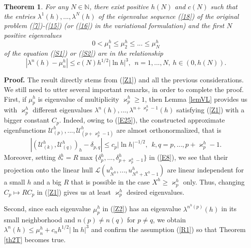 \documentclass[11pt]{article}%
\newtheorem{theorem}{Theorem}
\numberwithin{equation}{section}
\begin{document}
\begin{theorem}
\label{thASYM}For any $N\in\mathbb{N}$, there exist positive $h(N)$ and $c(N)$
such that the entries $\lambda^{1}(h),...,\lambda^{N}(h)$ of the eigenvalue
sequence (\ref{18}) of the original problem (\ref{7})-(\ref{15}) (or
(\ref{16}) in the variational formulation) and the first $N$ positive
eigenvalues%
\begin{equation}
0<\mu_{1}^{h}\leq\mu_{2}^{h}\leq...\leq\mu_{N}^{h} \label{Z2}%
\end{equation}
of the equation (\ref{S1}) or (\ref{S2}) are in the relationship%
\begin{equation}
|\lambda^{n}(h)-\mu_{n}^{h}|\leq c(N)h^{1/2}|\ln h|^{3},\ \ n=1,...,N,\ h\in
(0,h(N)). \label{Z3}%
\end{equation}

\end{theorem}

\textbf{Proof.} The result directly stems from (\ref{Z1}) and all the previous
considerations. We still need to utter several important remarks, in order to
complete the proof. First, if $\mu_{p}^{h}$ is eigenvalue of multiplicity
$\varkappa_{p}^{h}\geq1$, then Lemma \ref{lemVL} provides us with
$\varkappa_{p}^{h}$ different eigenvalues $\lambda^{n}(h),...,\lambda
^{n+\varkappa_{p}^{h}-1}(h)$ satisfying (\ref{Z1}) with a bigger constant
$C_{p}$. Indeed, owing to (\ref{E25}), the constructed approximate
eigenfunctions $\mathcal{U}_{(p)}^{h},...,\mathcal{U}_{(p+\varkappa_{p}%
^{h}-1)}^{h}$ are almost orthonormalized, that is%
\[
|(\mathcal{U}_{(k)}^{h},\mathcal{U}_{(q)}^{h})_{h}-\delta_{p,q}|\leq c_{p}|\ln
h|^{-1/2},\ \ k,q=p,...,p+\varkappa_{p}^{h}-1.
\]
Moreover, setting $\delta_{\ast}^{h}=R\max\{\delta_{p}^{h},...,\delta
_{p+\varkappa_{p}^{h}-1}^{h}\}$ in (\ref{E8}), we see that their projection
onto the linear hull $\mathcal{L}(u_{N^{h}}^{h},...,u_{N^{h}+X^{h}-1}^{h})$
are linear independent for a small $h$ and a big $R$ that is possible in the
case $X^{h}\geq\varkappa_{p}^{h}$ only. Thus, changing $C_{p}\mapsto RC_{p}$
in (\ref{Z1}) gives us at least $\varkappa_{p}^{h}$ desired eigenvalues.

Second, since each eigenvalue $\mu_{p}^{h}$ in (\ref{Z2}) has an eigenvalue
$\lambda^{n^{h}(p)}(h)$ in its small neighborhood and $n(p)\neq n(q)$ for
$p\neq q$, we obtain $\lambda^{n}(h)\leq\mu_{n}^{h}+c_{n}h^{1/2}|\ln h|^{3}$
and confirm the assumption (\ref{R1}) so that Theorem \ref{th2T} becomes true.
\end{document}
